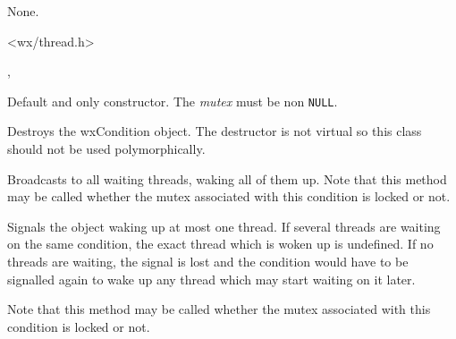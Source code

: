 
None.


<wx/thread.h>


, 


\label{wxconditionconstr}


Default and only constructor. The {\it mutex} must be non {\tt NULL}.



Destroys the wxCondition object. The destructor is not virtual so this class
should not be used polymorphically.

\label{wxconditionbroadcast}


Broadcasts to all waiting threads, waking all of them up. Note that this method
may be called whether the mutex associated with this condition is locked or
not.



\label{wxconditionsignal}


Signals the object waking up at most one thread. If several threads are waiting
on the same condition, the exact thread which is woken up is undefined. If no
threads are waiting, the signal is lost and the condition would have to be
signalled again to wake up any thread which may start waiting on it later.

Note that this method may be called whether the mutex associated with this
condition is locked or not.



\label{wxconditionwait}


